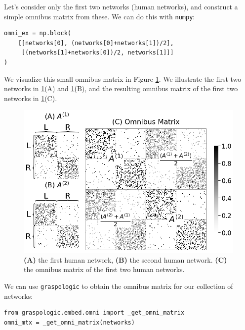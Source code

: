 Let's consider only the first two networks (human networks), and construct a simple omnibus matrix from these. We can do this with \texttt{numpy}:

\begin{lstlisting}[style=python]
omni_ex = np.block(
    [[networks[0], (networks[0]+networks[1])/2],
     [(networks[1]+networks[0])/2, networks[1]]]
)
\end{lstlisting}

We visualize this small omnibus matrix in Figure \ref{fig:ch6:multinet:omni:ex}. We illustrate the first two networks in \ref{fig:ch6:multinet:omni:ex}(A) and \ref{fig:ch6:multinet:omni:ex}(B), and the resulting omnibus matrix of the first two networks in \ref{fig:ch6:multinet:omni:ex}(C).

\begin{figure}[h]
    \centering
    \includegraphics[width=\linewidth]{representations/ch6/Images/omni_ex.png}
    \caption[simple example of omnibus matrix]{\textbf{(A)} the first human network, \textbf{(B)} the second human network. \textbf{(C)} the omnibus matrix of the first two human networks.}
    \label{fig:ch6:multinet:omni:ex}
\end{figure}

We can use \texttt{graspologic} to obtain the omnibus matrix for our collection of networks:
\begin{lstlisting}[style=python]
from graspologic.embed.omni import _get_omni_matrix
omni_mtx = _get_omni_matrix(networks)
\end{lstlisting}

